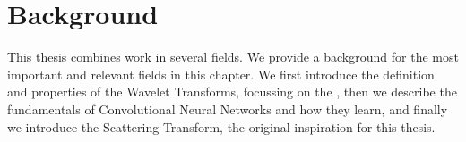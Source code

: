 \chapter{Background}\label{ch:litreview}
This thesis combines work in several fields. We provide a background for the most important
and relevant fields in this chapter. We first introduce the definition and properties of
the Wavelet Transforms, focussing on the \DTCWT, then we describe the fundamentals of Convolutional Neural Networks and how they learn,
and finally we introduce the Scattering Transform, the original inspiration for this thesis.






